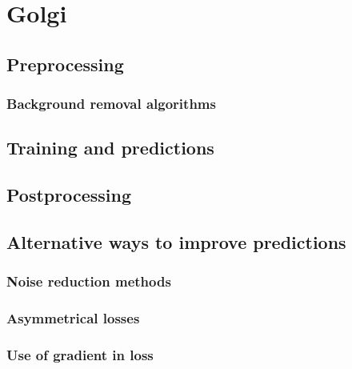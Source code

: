 \section{Golgi}
    \subsection{Preprocessing}
        
        \subsubsection{Background removal algorithms}
        
    \subsection{Training and predictions}
        

    \subsection{Postprocessing}
    \subsection{Alternative ways to improve predictions}
        \subsubsection{Noise reduction methods}
        \subsubsection{Asymmetrical losses}
        \subsubsection{Use of gradient in loss}
